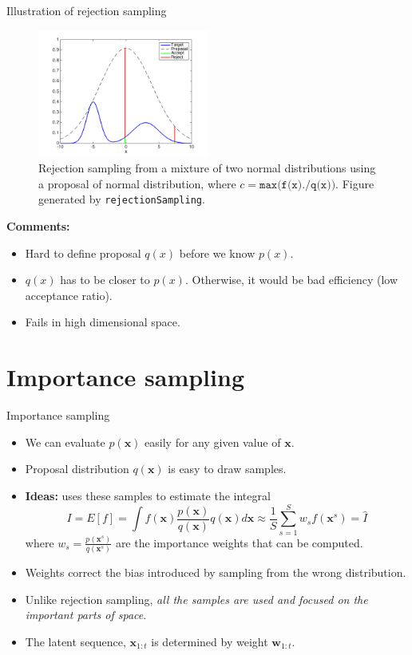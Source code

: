 \documentclass[10pt,mathserif]{beamer}
\begin{document}
\begin{frame}{Illustration of rejection sampling}
\begin{figure}[h]
\centering
\includegraphics[width=0.5\textwidth]{rejectionSampling}
\caption{Rejection sampling from a mixture of two normal distributions using a proposal of normal distribution, where $c = \texttt{max(f(x)./q(x))}$. Figure generated by \texttt{rejectionSampling}.}
\end{figure} 

\textbf{Comments:}
\begin{itemize}
    \item Hard to define proposal $q(x)$ before we know $p(x)$.
    \item $q(x)$ has to be closer to $p(x)$. Otherwise, it would be bad efficiency (low acceptance ratio).
    \item Fails in high dimensional space.
\end{itemize}
\end{frame}

\section{Importance sampling}
\begin{frame}{Importance sampling}
\begin{itemize}
    \item We can evaluate $p(\bm{x})$ easily for any given value of $\bm{x}$. 
    \item Proposal distribution $q(\bm{x})$ is easy to draw samples.
    \item \textbf{Ideas:} uses these samples to estimate the integral
    \begin{equation*} 
        I = E[f] = \int f(\bm{x})\frac{p(\bm{x})}{q(\bm{x})}q(\bm{x}) d\bm{x} \approx \frac{1}{S}\sum_{s=1}^S w_s f(\bm{x}^s)=\hat{I}
    \end{equation*} 
    where $w_s = \frac{p(\bm{x}^s)}{q(\bm{x}^s)}$ are the importance weights that can be computed.
    \item  Weights correct the bias introduced by sampling from the wrong distribution.
    \item Unlike rejection sampling, \textit{all the samples are used and focused on the important parts of space}.
    \item The latent sequence, $\bm{x}_{1:t}$ is determined by weight $\bm{w}_{1:t}$.
\end{itemize}    
\end{frame}
\end{document}
